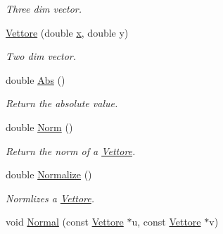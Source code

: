 \begin{DoxyCompactItemize}
\begin{DoxyCompactList}\small\item\em \-Three dim vector. \end{DoxyCompactList}\item 
\hypertarget{classVettore_ad34a806257f874147444a9dad1d38b9c}{\hyperlink{classVettore_ad34a806257f874147444a9dad1d38b9c}{\-Vettore} (double \hyperlink{classVettore_a711aad4cbe735871dd9e91ab575c878b}{x}, double y)}\label{classVettore_ad34a806257f874147444a9dad1d38b9c}

\begin{DoxyCompactList}\small\item\em \-Two dim vector. \end{DoxyCompactList}\item 
\hypertarget{classVettore_adbeac31b68a3e0dc78dfe0591d392e48}{double \hyperlink{classVettore_adbeac31b68a3e0dc78dfe0591d392e48}{\-Abs} ()}\label{classVettore_adbeac31b68a3e0dc78dfe0591d392e48}

\begin{DoxyCompactList}\small\item\em \-Return the absolute value. \end{DoxyCompactList}\item 
\hypertarget{classVettore_ac3486702edb3f0a9835908841db69cfd}{double \hyperlink{classVettore_ac3486702edb3f0a9835908841db69cfd}{\-Norm} ()}\label{classVettore_ac3486702edb3f0a9835908841db69cfd}

\begin{DoxyCompactList}\small\item\em \-Return the norm of a \hyperlink{classVettore}{\-Vettore}. \end{DoxyCompactList}\item 
\hypertarget{classVettore_aef629c102c4d237ef6e4897238f5bc18}{double \hyperlink{classVettore_aef629c102c4d237ef6e4897238f5bc18}{\-Normalize} ()}\label{classVettore_aef629c102c4d237ef6e4897238f5bc18}

\begin{DoxyCompactList}\small\item\em \-Normlizes a \hyperlink{classVettore}{\-Vettore}. \end{DoxyCompactList}\item 
\hypertarget{classVettore_a6c47c5bf64582210d56650fb8f490201}{void \hyperlink{classVettore_a6c47c5bf64582210d56650fb8f490201}{\-Normal} (const \hyperlink{classVettore}{\-Vettore} $\ast$u, const \hyperlink{classVettore}{\-Vettore} $\ast$v)}\label{classVettore_a6c47c5bf64582210d56650fb8f490201}


\end{DoxyCompactItemize}
